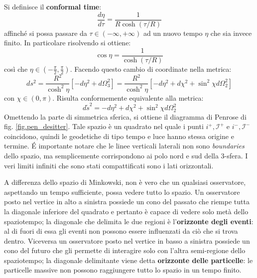 Si definisce il \textbf{conformal time}:
\begin{equation*}
    \frac{d \eta}{d\tau} = \frac{1}{R\cosh(\tau/R)}
\end{equation*}
affinché si possa passare da $\tau \in (-\infty,+\infty)$ ad un nuovo tempo $\eta$ che sia invece finito. In particolare risolvendo si ottiene:
\begin{equation*}
    \cos \eta = \frac{1}{\cosh(\tau/R)}
\end{equation*}
così che $\eta \in (- \frac{\pi}{2}, \frac{\pi}{2})$. Facendo questo cambio di coordinate nella metrica:
\begin{equation*}
    ds^2 = \frac{R^2}{\cosh^2\eta}\left[ - d\eta^2 + d\Omega_3^2 \right] = \frac{R^2}{\cosh^2\eta}\left[ - d\eta^2 + d\chi^2 + \sin^2\chi d\Omega_2^2\right]
\end{equation*}
con $\chi \in (0,\pi)$. Risulta conformemente equivalente alla metrica:
\begin{equation*}
    d\tilde{s}^2 = - d\eta^2 + d\chi^2 + \sin^2\chi d\Omega_2^2
\end{equation*}
Omettendo la parte di simmetrica sferica, si ottiene il diagramma di Penrose di fig. \ref{fig.pen_desitter}. Tale spazio è un quadrato nel quale i punti $i^+, \mathcal{I}^+$ e $i^-, \mathcal{I}^-$ coincidono, quindi le geodetiche di tipo tempo e luce hanno stessa origine e termine. \'E importante notare che le linee verticali laterali non sono \emph{boundaries} dello spazio, ma semplicemente corrispondono ai polo nord e sud della 3-sfera. I veri limiti infiniti che sono stati compattificati sono i lati orizzontali.

A differenza dello spazio di Minkowski, non è vero che un qualsiasi osservatore, aspettando un tempo sufficiente, possa vedere tutto lo spazio. Un osservatore posto nel vertice in alto a sinistra possiede un cono del passato che riempe tutta la diagonale inferiore del quadrato e pertanto è capace di vedere solo metà dello spaziotempo; la diagonale che delimita le due regioni è l'\textbf{orizzonte degli eventi}: al di fuori di essa gli eventi non possono essere influenzati da ciò che si trova dentro.
Viceversa un osservatore posto nel vertice in basso a sinistra possiede un cono del futuro che gli permette di interagire solo con l'altra semi-regione dello spaziotempo; la diagonale delimitante viene detta \textbf{orizzonte delle particelle}: le particelle massive non possono raggiungere tutto lo spazio in un tempo finito.

